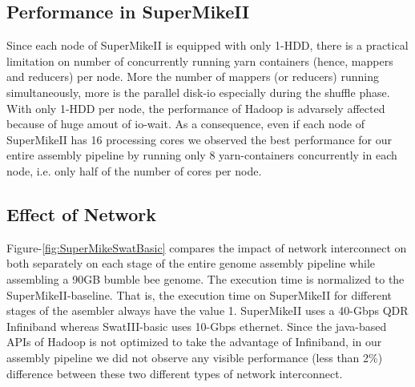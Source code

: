 \documentclass[conference]{IEEEtran}
\begin{document}
\subsection {Performance in SuperMikeII}
\label{PerformanceInSuperMikeII}
Since each node of SuperMikeII is equipped with only 1-HDD, there is a practical limitation on number of concurrently running yarn containers (hence, mappers and reducers) per node. 
More the number of mappers (or reducers) running simultaneously, more is the parallel disk-io especially during the shuffle phase. 
With only 1-HDD per node, the performance of Hadoop is advarsely affected because of huge amout of io-wait.
As a consequence, even if each node of SuperMikeII has 16 processing cores we observed the best performance for our entire assembly pipeline by running only 8 yarn-containers concurrently in each node, i.e. only half of the number of cores per node.


\subsection {Effect of Network} \label{EffectOfNetwork}
Figure-\ref{fig:SuperMikeSwatBasic} compares the impact of network interconnect on both separately on each stage of the entire genome assembly pipeline while assembling a 90GB bumble bee genome. 
The execution time is normalized to the SuperMikeII-baseline. That is, the execution time on SuperMikeII for different stages of the asembler always have the value 1.
SuperMikeII uses a 40-Gbps QDR Infiniband whereas SwatIII-basic uses 10-Gbps ethernet. 
Since the java-based APIs of Hadoop is not optimized to take the advantage of Infiniband, in our assembly pipeline we did not observe any visible performance (less than 2\%) difference between these two different types of network interconnect.

\end{document}
